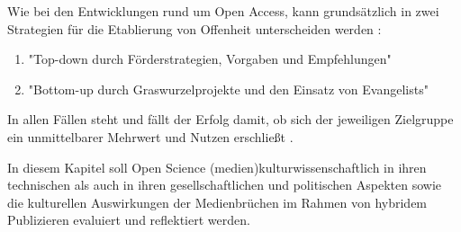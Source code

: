Wie bei den Entwicklungen rund um Open Access, kann grundsätzlich in zwei Strategien für die Etablierung von Offenheit unterscheiden werden \cite{schulze_2013_open}: 
\begin{enumerate}
\item "Top-down durch Förderstrategien, Vorgaben und Empfehlungen"
\item "Bottom-up durch Graswurzelprojekte und den Einsatz von Evangelists"
\end{enumerate} In allen Fällen steht und fällt der Erfolg damit, ob sich der jeweiligen Zielgruppe ein unmittelbarer Mehrwert und Nutzen erschließt \cite{schulze_2013_open}.


In diesem Kapitel soll Open Science (medien)kulturwissenschaftlich in ihren technischen als auch in ihren gesellschaftlichen und politischen Aspekten sowie die kulturellen Auswirkungen der Medienbrüchen im Rahmen von hybridem Publizieren evaluiert und reflektiert werden.
